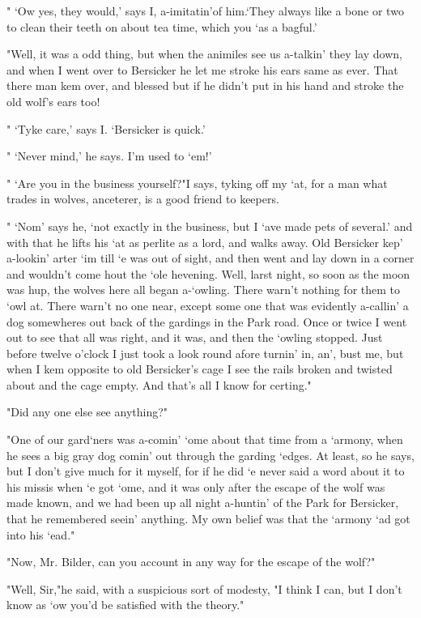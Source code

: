 " `Ow yes, they would,' says I, a-imitatin'of him.`They always like a bone or two to clean their teeth on about tea time, which you `as a bagful.' 

"Well, it was a odd thing, but when the animiles see us a-talkin' they lay down, and when I went over to Bersicker he let me stroke his ears same as ever. That there man kem over, and blessed but if he didn't put in his hand and stroke the old wolf's ears too! 

" `Tyke care,' says I. `Bersicker is quick.' 

" `Never mind,' he says. I'm used to `em!' 

" `Are you in the business yourself?"I says, tyking off my `at, for a man what trades in wolves, anceterer, is a good friend to keepers. 

" `Nom' says he, `not exactly in the business, but I `ave made pets of several.' and with that he lifts his `at as perlite as a lord, and walks away. Old Bersicker kep' a-lookin' arter `im till `e was out of sight, and then went and lay down in a corner and wouldn't come hout the `ole hevening. Well, larst night, so soon as the moon was hup, the wolves here all began a-`owling. There warn't nothing for them to `owl at. There warn't no one near, except some one that was evidently a-callin' a dog somewheres out back of the gardings in the Park road. Once or twice I went out to see that all was right, and it was, and then the `owling stopped. Just before twelve o'clock I just took a look round afore turnin' in, an', bust me, but when I kem opposite to old Bersicker's cage I see the rails broken and twisted about and the cage empty. And that's all I know for certing." 

"Did any one else see anything?" 

"One of our gard`ners was a-comin' `ome about that time from a `armony, when he sees a big gray dog comin' out through the garding `edges. At least, so he says, but I don't give much for it myself, for if he did `e never said a word about it to his missis when `e got `ome, and it was only after the escape of the wolf was made known, and we had been up all night a-huntin' of the Park for Bersicker, that he remembered seein' anything. My own belief was that the `armony `ad got into his `ead." 

"Now, Mr. Bilder, can you account in any way for the escape of the wolf?" 

"Well, Sir,"he said, with a suspicious sort of modesty, "I think I can, but I don't know as `ow you'd be satisfied with the theory." 

